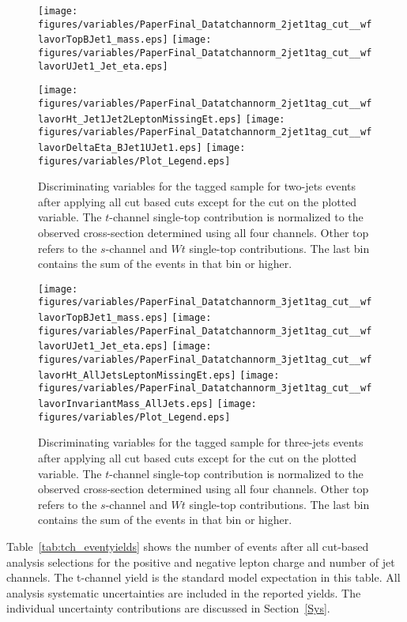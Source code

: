  \begin{figure}[!h!tpb]
 \centering
 \texttt{[image: figures/variables/PaperFinal\_Datatchannorm\_2jet1tag\_cut\_\_wflavorTopBJet1\_mass.eps]}
 \texttt{[image: figures/variables/PaperFinal\_Datatchannorm\_2jet1tag\_cut\_\_wflavorUJet1\_Jet\_eta.eps]}

 \texttt{[image: figures/variables/PaperFinal\_Datatchannorm\_2jet1tag\_cut\_\_wflavorHt\_Jet1Jet2LeptonMissingEt.eps]}
 \texttt{[image: figures/variables/PaperFinal\_Datatchannorm\_2jet1tag\_cut\_\_wflavorDeltaEta\_BJet1UJet1.eps]}
 \texttt{[image: figures/variables/Plot\_Legend.eps]}
\vspace{-0.5cm}
 \caption{Discriminating variables for the tagged sample for two-jets events after applying all cut based cuts except for the cut on the plotted variable.  The $t$-channel single-top contribution is normalized to the observed cross-section determined using all four channels. Other top refers to the $s$-channel and $Wt$ single-top contributions.  The last bin contains the sum of the events in that bin or higher. }
 \label{fig:Plot_2TagCuts}
 \end{figure}


 \begin{figure}[!h!tpb]
 \centering
 \texttt{[image: figures/variables/PaperFinal\_Datatchannorm\_3jet1tag\_cut\_\_wflavorTopBJet1\_mass.eps]}
 \texttt{[image: figures/variables/PaperFinal\_Datatchannorm\_3jet1tag\_cut\_\_wflavorUJet1\_Jet\_eta.eps]}
 \texttt{[image: figures/variables/PaperFinal\_Datatchannorm\_3jet1tag\_cut\_\_wflavorHt\_AllJetsLeptonMissingEt.eps]}
 \texttt{[image: figures/variables/PaperFinal\_Datatchannorm\_3jet1tag\_cut\_\_wflavorInvariantMass\_AllJets.eps]}
 \texttt{[image: figures/variables/Plot\_Legend.eps]}
\vspace{-0.5cm}
 \caption{Discriminating variables for the tagged sample for three-jets events after applying all cut based cuts except for the cut on the plotted variable. The $t$-channel single-top contribution is normalized to the observed cross-section determined using all four channels. Other top refers to the $s$-channel and $Wt$ single-top contributions.  The last bin contains the sum of the events in that bin or higher. }
 \label{fig:Plot_3TagCuts}
 \end{figure}

Table~\ref{tab:tch_eventyields} shows the number of events after all cut-based analysis selections for the positive and negative lepton charge and number of jet channels.  The t-channel yield is the standard model expectation in this table.  All analysis systematic uncertainties are included in the reported yields.  The individual uncertainty contributions are discussed in Section~\ref{Sys}.

